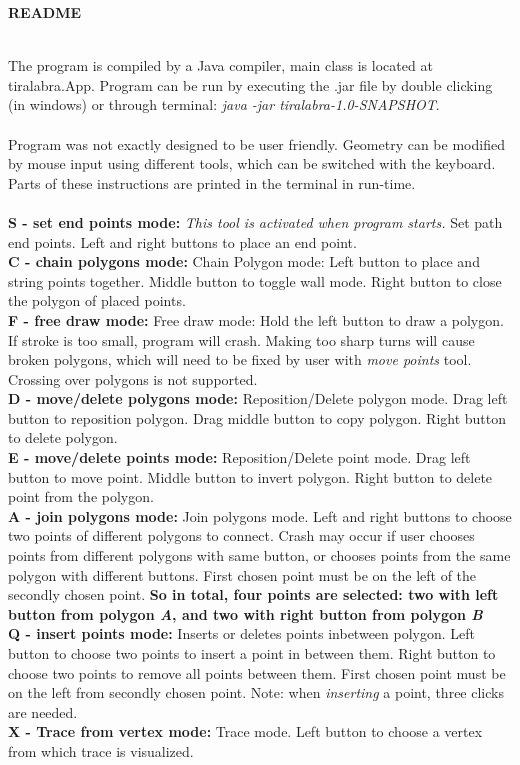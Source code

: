 \documentclass[a4paper,12pt]{article}
\begin{document}
\centerline{\huge \textbf{README}} \hspace*{\fill}
\\
The program is compiled by a Java compiler, main class is located at tiralabra.App. Program can be run by executing the .jar file by double clicking (in windows) or through terminal: \emph{java -jar tiralabra-1.0-SNAPSHOT}.\\
\\
Program was not exactly designed to be user friendly. Geometry can be modified by mouse input using different tools, which can be switched with the keyboard. Parts of these instructions are printed in the terminal in run-time.\\
\\
\textbf{S - set end points mode:} \emph{This tool is activated when program starts.} Set path end points. Left and right buttons to place an end point.\\
\textbf{C - chain polygons mode:} Chain Polygon mode: Left button to place and string points together. Middle button to toggle wall mode. Right button to close the polygon of placed points.\\
\textbf{F - free draw mode:} Free draw mode: Hold the left button to draw a polygon. If stroke is too small, program will crash. Making too sharp turns will cause broken polygons, which will need to be fixed by user with \emph{move points} tool. Crossing over polygons is not supported.\\
\textbf{D - move/delete polygons mode:} Reposition/Delete polygon mode. Drag left button to reposition polygon. Drag middle button to copy polygon. Right button to delete polygon.\\
\textbf{E - move/delete points mode:} Reposition/Delete point mode. Drag left button to move point. Middle button to invert polygon. Right button to delete point from the polygon.\\
\textbf{A - join polygons mode:} Join polygons mode. Left and right buttons to choose two points of different polygons to connect. Crash may occur if user chooses points from different polygons with same button, or chooses points from the same polygon with different buttons. First chosen point must be on the left of the secondly chosen point. \textbf{So in total, four points are selected: two with left button from polygon \emph{A}, and two with right button from polygon \emph{B}}\\
\textbf{Q - insert points mode:} Inserts or deletes points inbetween polygon. Left button to choose two points to insert a point in between them. Right button to choose two points to remove all points between them. First chosen point must be on the left from secondly chosen point. Note: when \emph{inserting} a point, three clicks are needed.\\
\textbf{X - Trace from vertex mode:} Trace mode. Left button to choose a vertex from which trace is visualized.\\
\end{document}
